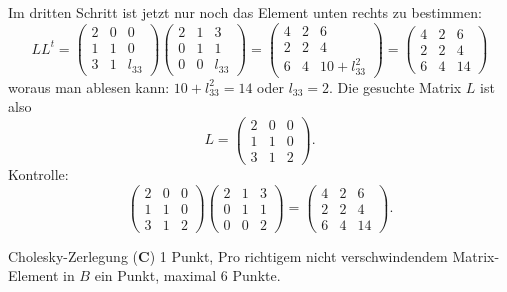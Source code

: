 \begin{loesung}
Im dritten Schritt ist jetzt nur noch das Element unten rechts zu bestimmen:
\[
LL^t=
\begin{pmatrix}
2&0&     0\\
1&1&     0\\
3&1&l_{33}
\end{pmatrix}
\begin{pmatrix}
2&1&     3\\
0&1&     1\\
0&0&l_{33}
\end{pmatrix}
=
\begin{pmatrix}
    4&   2&   6\\
    2&   2&   4\\
    6&   4& 10+l_{33}^2
\end{pmatrix}
=
\begin{pmatrix}
    4&   2&   6\\
    2&   2&   4\\
    6&   4&  14
\end{pmatrix}
\]
woraus man ablesen kann: $10+l_{33}^2=14$ oder $l_{33}=2$. Die gesuchte
Matrix $L$ ist also
\[
L=
\begin{pmatrix}
2&0&0\\
1&1&0\\
3&1&2
\end{pmatrix}.
\]
Kontrolle:
\[
\begin{pmatrix}
2&0&0\\
1&1&0\\
3&1&2
\end{pmatrix}
\begin{pmatrix}
2&1&3\\
0&1&1\\
0&0&2
\end{pmatrix}
=
\begin{pmatrix}
    4&   2&   6\\
    2&   2&   4\\
    6&   4&  14
\end{pmatrix}.
\]
\end{loesung}

\begin{bewertung}
Cholesky-Zerlegung ({\bf C}) 1 Punkt,
Pro richtigem nicht verschwindendem Matrix-Element in $B$ ein Punkt,
maximal 6 Punkte.
\end{bewertung}
